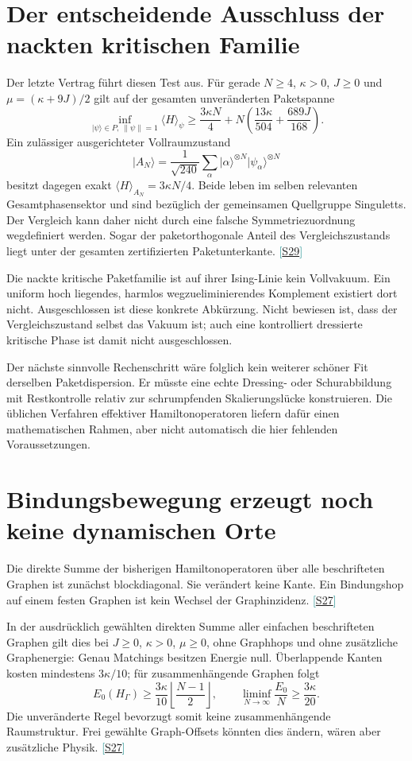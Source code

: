 \documentclass[11pt,a4paper,oneside,parskip=half,headings=normal,numbers=noenddot,bibliography=totoc]{scrreprt}
\newcommand{\ket}[1]{\lvert #1\rangle}
\newcommand{\src}[1]{\textcolor{teal}{\small[\hyperref[s:#1]{S#1}]}}
\newcommand{\finding}[2]{\begin{tcolorbox}[enhanced,breakable,colback=pale,colframe=teal,boxrule=0pt,borderline west={2pt}{0pt}{teal},arc=0mm,left=3mm,right=3mm,top=2mm,bottom=2mm,title={#1},coltitle=ink,colbacktitle=pale,fonttitle=\sffamily\bfseries]#2\end{tcolorbox}}
\begin{document}
\section{Der entscheidende Ausschluss der nackten kritischen Familie}
Der letzte Vertrag führt diesen Test aus. Für gerade $N\ge4$, $\kappa>0$, $J\ge0$ und $\mu=(\kappa+9J)/2$ gilt auf der gesamten unveränderten Paketspanne
\[
 \inf_{\ket\psi\in P,\ \|\psi\|=1}\langle H\rangle_\psi
 \ge\frac{3\kappa N}{4}
 +N\left(\frac{13\kappa}{504}+\frac{689J}{168}\right).
\]
Ein zulässiger ausgerichteter Vollraumzustand
\[
 \ket{A_N}=\frac1{\sqrt{240}}\sum_\alpha
 \ket\alpha^{\otimes N}\ket{\psi_\alpha}^{\otimes N}
\]
besitzt dagegen exakt $\langle H\rangle_{A_N}=3\kappa N/4$. Beide leben im selben relevanten Gesamtphasensektor und sind bezüglich der gemeinsamen Quellgruppe Singuletts. Der Vergleich kann daher nicht durch eine falsche Symmetriezuordnung wegdefiniert werden. Sogar der paketorthogonale Anteil des Vergleichszustands liegt unter der gesamten zertifizierten Paketunterkante. \src{29}

\finding{Was damit entschieden ist}{Die nackte kritische Paketfamilie ist auf ihrer Ising-Linie kein Vollvakuum. Ein uniform hoch liegendes, harmlos wegzueliminierendes Komplement existiert dort nicht. Ausgeschlossen ist diese konkrete Abkürzung. Nicht bewiesen ist, dass der Vergleichszustand selbst das Vakuum ist; auch eine kontrolliert dressierte kritische Phase ist damit nicht ausgeschlossen.}

Der nächste sinnvolle Rechenschritt wäre folglich kein weiterer schöner Fit derselben Paketdispersion. Er müsste eine echte Dressing- oder Schurabbildung mit Restkontrolle relativ zur schrumpfenden Skalierungslücke konstruieren. Die üblichen Verfahren effektiver Hamiltonoperatoren liefern dafür einen mathematischen Rahmen, aber nicht automatisch die hier fehlenden Voraussetzungen. \cite{sw}

\section{Bindungsbewegung erzeugt noch keine dynamischen Orte}
Die direkte Summe der bisherigen Hamiltonoperatoren über alle beschrifteten Graphen ist zunächst blockdiagonal. Sie verändert keine Kante. Ein Bindungshop auf einem festen Graphen ist kein Wechsel der Graphinzidenz. \src{27}

In der ausdrücklich gewählten direkten Summe aller einfachen beschrifteten Graphen gilt dies bei $J\ge0$, $\kappa>0$, $\mu\ge0$, ohne Graphhops und ohne zusätzliche Graphenergie: Genau Matchings besitzen Energie null. Überlappende Kanten kosten mindestens $3\kappa/10$; für zusammenhängende Graphen folgt
\[
 E_0(H_\Gamma)\ge\frac{3\kappa}{10}\left\lfloor\frac{N-1}{2}\right\rfloor,
 \qquad\liminf_{N\to\infty}\frac{E_0}{N}\ge\frac{3\kappa}{20}.
\]
Die unveränderte Regel bevorzugt somit keine zusammenhängende Raumstruktur. Frei gewählte Graph-Offsets könnten dies ändern, wären aber zusätzliche Physik. \src{27}
\end{document}
